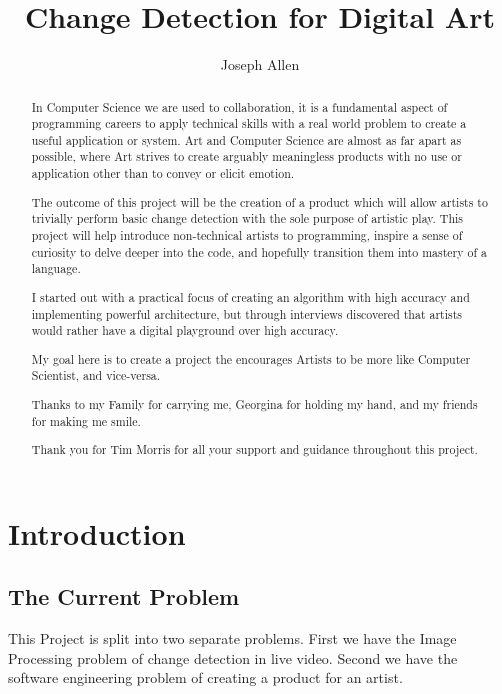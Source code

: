 \documentclass[a4paper]{report}
\title{Change Detection for Digital Art}
\author{Joseph Allen}
\begin{document}
\maketitle

\begin{abstract}
In Computer Science we are used to collaboration, it is a fundamental aspect of programming careers to apply technical skills with a real world problem to create a useful application or system. Art and Computer Science are almost as far apart as possible, where Art strives to create arguably meaningless products with no use or application other than to convey or elicit emotion. 

The outcome of this project will be the creation of a product which will allow artists to trivially perform basic change detection with the sole purpose of artistic play. This project will help introduce non-technical artists to programming, inspire a sense of curiosity to delve deeper into the code, and hopefully transition them into mastery of a language.

I started out with a practical focus of creating an algorithm with high accuracy and implementing powerful architecture, but through interviews discovered that artists would rather have a digital playground over high accuracy.

My goal here is to create a project the encourages Artists to be more like Computer Scientist, and vice-versa.
\end{abstract}

\renewcommand{\abstractname}{Acknowledgements}
\begin{abstract}
Thanks to my Family for carrying me, Georgina for holding my hand, and my friends for making me smile.


Thank you for Tim Morris for all your support and guidance throughout this project.
\end{abstract}

\tableofcontents
\clearpage

\chapter{Introduction}
\section{The Current Problem}
This Project is split into two separate problems. First we have the Image Processing problem of change detection in live video. Second we have the software engineering problem of creating a product for an artist.
\end{document}
